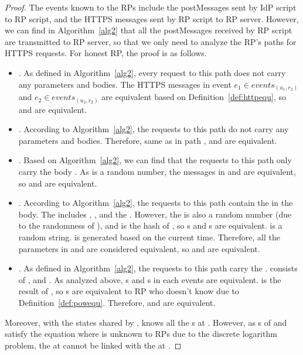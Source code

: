\begin{appendices}
\begin{proof}
The events known to the RPs include the postMessages sent by IdP script to RP script, and the HTTPS messages sent by RP script to RP server. However, we can find in Algorithm~\ref{alg2} that all the postMessages received by RP script are transmitted to RP server, so that we  only need to analyze the RP's paths for HTTPS requests. For honest RP, the proof is as follows.
\begin{itemize}
\item {}. As defined in Algorithm~\ref{alg2}, every request to this path does not carry any parameters and bodies. The HTTPS messages in event $e_1 \in events_{(u_1, r_2)}$ and $e_2 \in events_{(u_2, r_2)}$ are equivalent based on Definition~\ref{def:httpequ}, so  and  are equivalent.
\item {}. According to Algorithm~\ref{alg2}, the requests to this path do not carry any parameters and bodies. Therefore, same as in path ,  and  are equivalent.
\item {}. Based on  Algorithm~\ref{alg2}, we can find that the requests to this path only carry the body  . As  is a random  number, the messages in  and  are equivalent, so  and  are equivalent.
\item {}. According to Algorithm~\ref{alg2}, the requests to this path contain the  in the body. The  includes , ,  and the . However, the  is also a random number (due to the randomness of ), and  is the hash of , so s and s are equivalent.  is a  random string.  is generated based on the current time. Therefore, all the parameters in  and  are considered equivalent, so  and  are equivalent.
\item {}.  As  defined in  Algorithm~\ref{alg2}, the requests to this path carry the .  consists of ,  and . As analyzed above, s and s in each events are equivalent.  is the result of , so s are equivalent to RP who doesn't know  due to Definition~\ref{def:powequ}. Therefore,   and  are equivalent.
\end{itemize}
Moreover, with the states shared by ,  knows  all  the s at . However, as s of  and  satisfy the equation  \myss{\equiv}   where  is unknown to RPs due to the discrete logarithm problem,  the  at  cannot be linked with the  at .


\end{proof}
\end{appendices}
